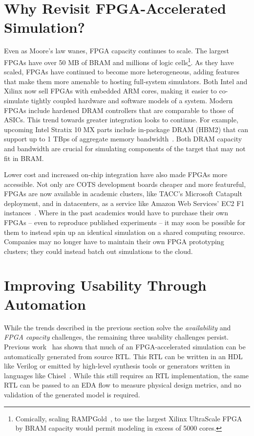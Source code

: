 \section{Why Revisit FPGA-Accelerated Simulation?}

Even as Moore's law wanes, FPGA capacity continues to scale. The largest FPGAs
have over 50 MB of BRAM and millions of logic cells\footnote{Comically, scaling
RAMPGold~\cite{rampgold}, to use the largest Xilinx UltraScale
FPGA~\cite{ultrascale} by BRAM capacity would permit modeling in excess of 5000
cores.}. As they have scaled, FPGAs have continued to become more
heterogeneous, adding features that make them more amenable to hosting
full-system simulators.  Both Intel and Xilinx now sell FPGAs with embedded ARM
cores, making it easier to co-simulate tightly coupled hardware and software
models of a system. Modern FPGAs include hardened DRAM controllers that are
comparable to those of ASICs. This trend towards greater integration looks to
continue. For example, upcoming Intel Stratix 10 MX parts include in-package DRAM (HBM2)
that can support up to 1 TBps of aggregate memory bandwidth~\cite{stratix10mx}.
Both DRAM capacity and bandwidth are crucial for simulating components
of the target that may not fit in BRAM.

Lower cost and increased on-chip integration have also made FPGAs more
accessible. Not only are COTS development boards cheaper and more featureful,
FPGAs are now available in academic clusters, like TACC's Microsoft
Catapult~\cite{catapultannounce} deployment, and in datacenters, as a service
like Amazon Web Services' EC2 F1 instances~\cite{amazonf1}. Where in the past
academics would have to purchase their own FPGAs -- even to reproduce published
experiments -- it may soon be possible for them to instead spin up an identical
simulation on a shared computing resource. Companies may no longer have to
maintain their own FPGA prototyping clusters; they could instead batch out
simulations to the cloud.

\section{Improving Usability Through Automation}

While the trends described in the previous section solve the
\emph{availability} and \emph{FPGA capacity} challenges, the remaining three
usability challenges persist. Previous work~\cite{fabscalarfpga, strober} has
shown that much of an FPGA-accelerated simulation can be automatically
generated from source RTL. This RTL can be written in an HDL like Verilog or
emitted by high-level synthesis tools or generators written in languages like
Chisel~\cite{chisel}. While this still requires an RTL implementation, the same
RTL can be passed to an EDA flow to measure physical design metrics, and no
validation of the generated model is required.

